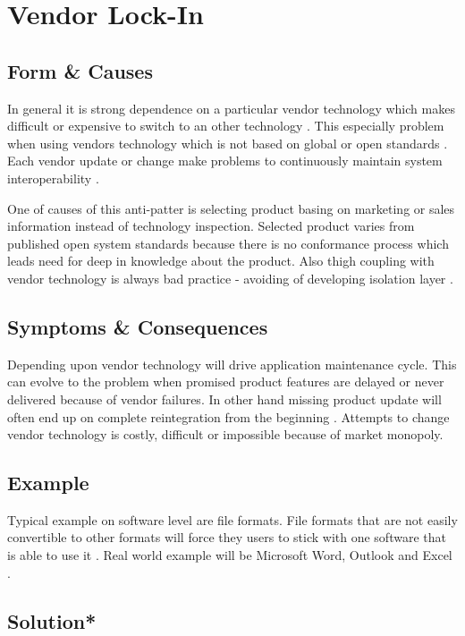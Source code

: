 \section{Vendor Lock-In}

\subsection{Form \& Causes}
In general it is strong dependence on a particular vendor technology which makes difficult or expensive to switch to an other technology \cite{Definition}. This especially problem when using vendors technology which is not based on global or open standards \cite{c2comVendor}. Each vendor update or change make problems to continuously maintain system interoperability \cite{SurvivalGuide}.

One of causes of this anti-patter is selecting product basing on marketing or sales information instead of technology inspection. Selected product varies from published open system standards because there is no conformance process which leads need for deep in knowledge about the product. Also thigh coupling with vendor technology is always bad practice - avoiding of developing isolation layer \cite{SurvivalGuide}.

\subsection{Symptoms \& Consequences}

Depending upon vendor technology will drive application maintenance cycle. This can evolve to the problem when promised product features are delayed or never delivered because of vendor failures. In other hand missing product update will often end up on complete reintegration from the beginning \cite{SurvivalGuide}.
Attempts to change vendor technology is costly, difficult or impossible because of market monopoly.

\subsection{Example}

Typical example on software level are file formats. File formats that are not easily convertible to other formats will force they users to stick with one software that is able to use it \cite{Definition}. Real world example will be Microsoft Word, Outlook and Excel \cite{VendorWiki}.


\subsection[Solution]{Solution*}

